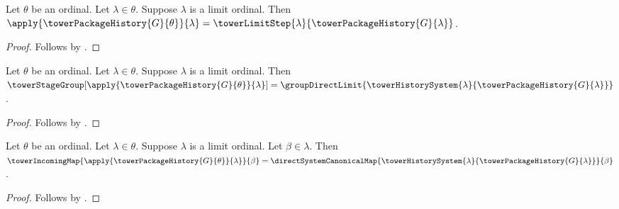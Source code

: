 \begin{proposition}\label{tower_package_history_limit_value}
    Let $\theta$ be an ordinal.
    Let $\lambda\in\theta$.
    Suppose $\lambda$ is a limit ordinal.
    Then $\apply{\towerPackageHistory{G}{\theta}}{\lambda}=
        \towerLimitStep{\lambda}{\towerPackageHistory{G}{\lambda}}$.
\end{proposition}
\begin{proof}
    Follows by
        .
\end{proof}

\begin{proposition}\label{tower_package_history_limit_group}
    Let $\theta$ be an ordinal.
    Let $\lambda\in\theta$.
    Suppose $\lambda$ is a limit ordinal.
    Then $\towerStageGroup[
            \apply{\towerPackageHistory{G}{\theta}}{\lambda}]=
        \groupDirectLimit{\towerHistorySystem{\lambda}{
            \towerPackageHistory{G}{\lambda}}}$.
\end{proposition}
\begin{proof}
    Follows by
        .
\end{proof}

\begin{proposition}\label{tower_package_history_limit_incoming}
    Let $\theta$ be an ordinal.
    Let $\lambda\in\theta$.
    Suppose $\lambda$ is a limit ordinal.
    Let $\beta\in\lambda$.
    Then $\towerIncomingMap{
            \apply{\towerPackageHistory{G}{\theta}}{\lambda}}{\beta}=
        \directSystemCanonicalMap{
            \towerHistorySystem{\lambda}{
                \towerPackageHistory{G}{\lambda}}}{\beta}$.
\end{proposition}
\begin{proof}
    Follows by
        .
\end{proof}

